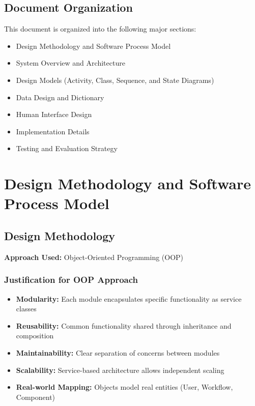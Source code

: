 \documentclass[12pt,a4paper]{article}
\begin{document}
\subsection{Document Organization}
This document is organized into the following major sections:
\begin{itemize}
    \item Design Methodology and Software Process Model
    \item System Overview and Architecture
    \item Design Models (Activity, Class, Sequence, and State Diagrams)
    \item Data Design and Dictionary
    \item Human Interface Design
    \item Implementation Details
    \item Testing and Evaluation Strategy
\end{itemize}

\newpage

\section{Design Methodology and Software Process Model}

\subsection{Design Methodology}
\textbf{Approach Used:} Object-Oriented Programming (OOP)

\subsubsection{Justification for OOP Approach}
\begin{itemize}
    \item \textbf{Modularity:} Each module encapsulates specific functionality as service classes
    \item \textbf{Reusability:} Common functionality shared through inheritance and composition
    \item \textbf{Maintainability:} Clear separation of concerns between modules
    \item \textbf{Scalability:} Service-based architecture allows independent scaling
    \item \textbf{Real-world Mapping:} Objects model real entities (User, Workflow, Component)
\end{itemize}
\end{document}
